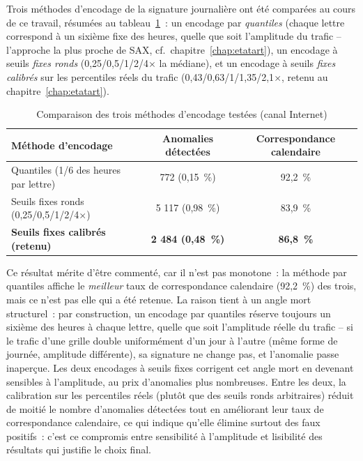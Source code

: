 Trois méthodes d'encodage de la signature journalière ont été
comparées au cours de ce travail, résumées au
tableau~\ref{tab:encodage-comparaison}~: un encodage par
\emph{quantiles} (chaque lettre correspond à un sixième fixe des
heures, quelle que soit l'amplitude du trafic -- l'approche la plus
proche de SAX, cf.~chapitre~\ref{chap:etatart}), un encodage à seuils
\emph{fixes ronds} (0,25/0,5/1/2/4$\times$ la médiane), et un encodage
à seuils \emph{fixes calibrés} sur les percentiles réels du trafic
(0,43/0,63/1/1,35/2,1$\times$, retenu au chapitre~\ref{chap:etatart}).

\begin{table}[htbp]
  \centering
  \caption{Comparaison des trois méthodes d'encodage testées (canal Internet)}
  \label{tab:encodage-comparaison}
  \begin{tabular}{lcc}
    \toprule
    \textbf{Méthode d'encodage} & \textbf{Anomalies détectées} & \textbf{Correspondance calendaire} \\
    \midrule
    Quantiles (1/6 des heures par lettre) & 772 (0,15~\%) & 92,2~\% \\
    Seuils fixes ronds (0,25/0,5/1/2/4$\times$) & 5 117 (0,98~\%) & 83,9~\% \\
    \textbf{Seuils fixes calibrés (retenu)} & \textbf{2 484 (0,48~\%)} & \textbf{86,8~\%} \\
    \bottomrule
  \end{tabular}
\end{table}

Ce résultat mérite d'être commenté, car il n'est pas monotone~: la
méthode par quantiles affiche le \emph{meilleur} taux de
correspondance calendaire (92,2~\%) des trois, mais ce n'est pas elle
qui a été retenue. La raison tient à un angle mort structurel~: par
construction, un encodage par quantiles réserve toujours un sixième
des heures à chaque lettre, quelle que soit l'amplitude réelle du
trafic -- si le trafic d'une grille double uniformément d'un jour à
l'autre (même forme de journée, amplitude différente), sa signature
ne change pas, et l'anomalie passe inaperçue. Les deux encodages à
seuils fixes corrigent cet angle mort en devenant sensibles à
l'amplitude, au prix d'anomalies plus nombreuses. Entre les deux,
la calibration sur les percentiles réels (plutôt que des seuils ronds
arbitraires) réduit de moitié le nombre d'anomalies détectées tout en
améliorant leur taux de correspondance calendaire, ce qui indique
qu'elle élimine surtout des faux positifs~: c'est ce compromis entre
sensibilité à l'amplitude et lisibilité des résultats qui justifie le
choix final.

